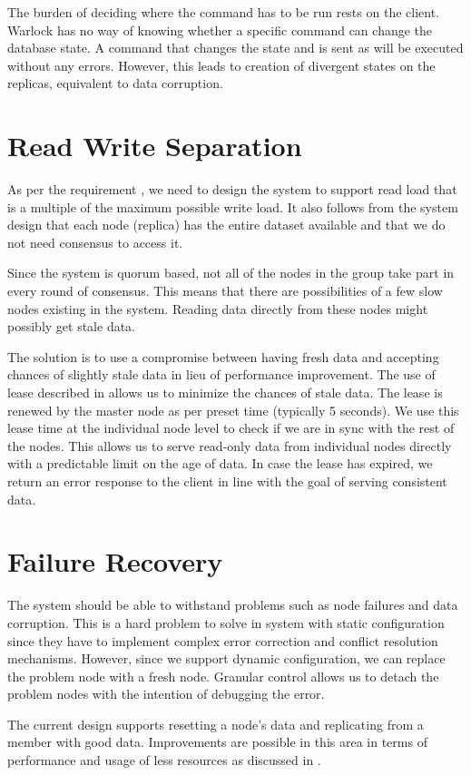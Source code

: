 The burden of deciding where the command has to be run rests on the client.
Warlock has no way of knowing whether a specific command can change the
database state. A
command that changes the state and is sent as  will be executed
without any errors. However, this leads to creation of divergent states
on the replicas, equivalent to data corruption.

\section{Read Write Separation}

As per the requirement , we need to design the
system to support read load that is a multiple of the maximum possible write
load. It also follows from the system design that each node (replica) has the
entire dataset available and that we do not need consensus to access it.

Since the system is quorum based, not all of the nodes in the group take part
in every round of consensus. This means that there are possibilities of a few
slow nodes existing in the system. Reading data directly from these nodes might
possibly get stale data.

The solution is to use a compromise between having fresh data and accepting
chances of slightly stale data in lieu of performance improvement. The
use of lease described in  allows us to minimize the
chances of stale data. The lease is renewed by the master node as per preset
time (typically 5 seconds). We use this lease time at the individual node level
to check if we are in sync with the rest of the nodes. This allows us to serve
read-only data from individual nodes directly with a predictable limit on the
age of data. In case the lease has expired, we return an error response to
the client in line with the goal of serving consistent data.

\section{Failure Recovery}

The system should be able to withstand problems such as node failures and data
corruption. This is a hard problem to solve in system with static configuration
since they have to implement complex error correction and conflict resolution
mechanisms. However, since we support dynamic configuration, we can replace
the problem node with a fresh node. Granular control allows us to detach the
problem nodes with the intention of debugging the error.

The current design supports resetting a node's data and replicating from
a member with good data. Improvements are possible in this area in terms of
performance and usage of less resources as discussed in
.


